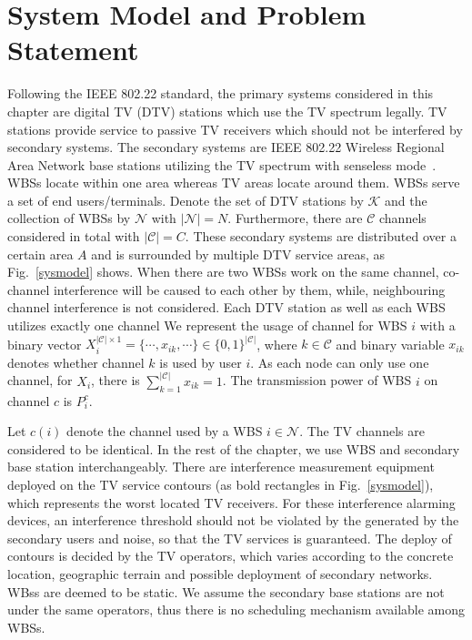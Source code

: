 \section{System Model and Problem Statement}
\label{SystemModel}
Following the IEEE 802.22 standard, the primary systems considered in this chapter are digital TV (\gls{DTV}) stations which use the TV spectrum legally. 
TV stations provide service to passive TV receivers which should not be interfered by secondary systems. 
The secondary systems are IEEE 802.22 Wireless Regional Area Network base stations utilizing the TV spectrum with senseless mode~\cite{SenseLess2011}. 
WBSs locate within one area whereas TV areas locate around them. 
WBSs serve a set of end users/terminals.
Denote the set of DTV stations by $\mathcal{K}$ and the collection of WBSs by $\mathcal{N}$ with $| \mathcal{N}|=N$. 
Furthermore, there are $\mathcal{C}$ channels considered in total with $|\mathcal{C}| = C$. 
These secondary systems are distributed over a certain area $A$ and is surrounded by multiple DTV service areas, as Fig.~\ref{sysmodel} shows. 
When there are two WBSs work on the same channel, co-channel interference will be caused to each other by them, while, neighbouring channel interference is not considered. Each DTV station as well as each WBS utilizes exactly one channel 
We represent the usage of channel for WBS $i$ with a binary vector $X_i^{|\mathcal{C}|\times 1}=\{\cdots, x_{ik}, \cdots\}\in \{0,1\}^{|\mathcal{C}|}$, where $k\in \mathcal{C}$ and binary variable $x_{ik}$ denotes whether channel $k$ is used by user $i$. As each node can only use one channel, for $X_i$, there is $\sum_{k=1}^{|\mathcal{C}|}x_{ik}=1$. 
The transmission power of WBS $i$ on channel $c$ is $P_i^c$. 

Let $c(i)$ denote the channel used by a WBS $i\in \mathcal{N}$. 
The TV channels are considered to be identical. 
In the rest of the chapter, we use WBS and secondary base station interchangeably. 
There are interference measurement equipment deployed on the TV service contours (as bold rectangles in Fig.~\ref{sysmodel}), which represents the worst located TV receivers. 
For these interference alarming devices, an interference threshold should not be violated by the generated by the secondary users and noise, so that the TV services is guaranteed.
The deploy of contours is decided by the TV operators, which varies according to the concrete location, geographic terrain and possible deployment of secondary networks. 
WBss are deemed to be static.
We assume the secondary base stations are not under the same operators, thus there is no scheduling mechanism available among WBSs.



